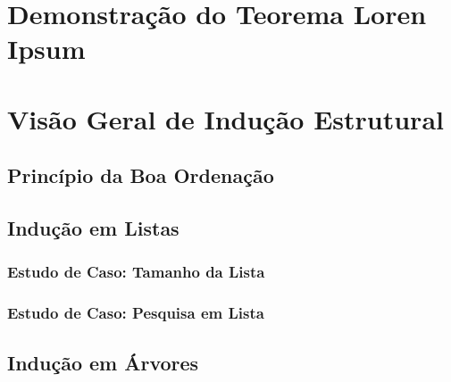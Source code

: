 \documentclass[times,english,brazil,oneside,section=TITLE]{ifes8}
\begin{document}
\postextual




\apendices

\partapendices*

\chapter{Demonstração do Teorema Loren Ipsum}

\blindtext[7]


\chapter{Visão Geral de Indução Estrutural}

\section{Princípio da Boa Ordenação}

\blindtext[3]

\section{Indução em Listas}

\blindtext[2]

\subsection{Estudo de Caso: Tamanho da Lista}

\blindtext[2]

\subsection{Estudo de Caso: Pesquisa em Lista}

\blindtext[2]

\section{Indução em Árvores}
\end{document}
